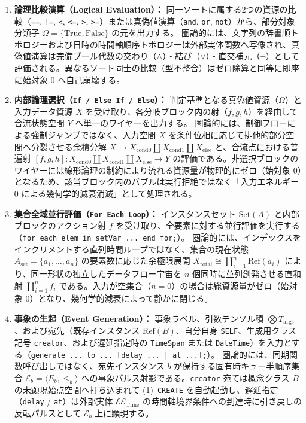 \documentclass[11pt,a4paper]{ltjsarticle}
\theoremstyle{definition}
\theoremstyle{plain}
\theoremstyle{remark}
\begin{document}
\begin{enumerate}[label=\textbf{(\arabic*)}, leftmargin=*]
    \item \textbf{論理比較演算（Logical Evaluation）：}
    同一ソートに属する2つの資源の比較（\texttt{==}, \texttt{!=}, \texttt{<}, \texttt{<=}, \texttt{>}, \texttt{>=}）または真偽値演算（\texttt{and}, \texttt{or}, \texttt{not}）から、部分対象分類子 $\Omega = \{\mathrm{True}, \mathrm{False}\}$ の元を出力する。
    圏論的には、文字列の辞書順トポロジーおよび日時の時間軸順序トポロジーは外部実体関数へ写像され、真偽値演算は完備ブール代数の交わり（$\wedge$）・結び（$\vee$）・直交補元（$\neg$）として評価される。異なるソート同士の比較（型不整合）はゼロ除算と同等に即座に始対象 $0$ へ自己崩壊する。

    \item \textbf{内部論理選択（\texttt{If / Else If / Else}）：}
    判定基準となる真偽値資源（$\Omega$）と入力データ資源 $X$ を受け取り、各分岐ブロック内の射（$f, g, h$）を経由して合流状態空間 $Y$ へ単一のワイヤーを出力する。
    圏論的には、制御フローによる強制ジャンプではなく、入力空間 $X$ を条件位相に応じて排他的部分空間へ分裂させる余積分解 $X \to X_{\mathrm{cond0}} \amalg X_{\mathrm{cond1}} \amalg X_{\mathrm{else}}$ と、合流点における普遍射 $[f, g, h] : X_{\mathrm{cond0}} \amalg X_{\mathrm{cond1}} \amalg X_{\mathrm{else}} \to Y$ の評価である。非選択ブロックのワイヤーには線形論理の制約により流れる資源量が物理的にゼロ（始対象 $0$）となるため、該当ブロック内のバブルは実行拒絶ではなく「入力エネルギー $0$ による幾何学的減衰消滅」として処理される。

    \item \textbf{集合全域並行評価（\texttt{For Each Loop}）：}
    インスタンスセット $\mathrm{Set}(A)$ と内部ブロックのアクション射 $f$ を受け取り、全要素に対する並行評価を実行する（\texttt{for each elem in setVar ... end for;}）。
    圏論的には、インデックスをインクリメントする直列時間ループではなく、集合の現在状態 $A_{\mathrm{set}} = \{a_1, \dots, a_n\}$ の要素数に応じた余極限展開 $X_{\mathrm{total}} \cong \coprod_{i=1}^n \mathrm{Ref}(a_i)$ により、同一形状の独立したデータフロー宇宙を $n$ 個同時に並列創発させる直和射 $\coprod_{i=1}^n f_i$ である。入力が空集合（$n=0$）の場合は総資源量がゼロ（始対象 $0$）となり、幾何学的減衰によって静かに閉じる。

    \item \textbf{事象の生起（Event Generation）：}
    事象ラベル、引数テンソル積 $\bigotimes T_{\mathrm{args}}$、および宛先（既存インスタンス $\mathrm{Ref}(B)$、自分自身 \texttt{SELF}、生成用クラス記号 \texttt{creator}、および遅延指定時の \texttt{TimeSpan} または \texttt{DateTime}）を入力とする（\texttt{generate ... to ... [delay ... | at ...];}）。
    圏論的には、同期関数呼び出しではなく、宛先インスタンス $b$ が保持する固有時キュー半順序集合 $\mathcal{E}_b = \langle E_b, \le_b \rangle$ \cite{milner1989} への事象パルス射影である。\texttt{creator} 宛ては概念クラス $B$ の未顕現始点空間へ打ち込まれて (1)~\texttt{CREATE} を自動起動し、遅延指定（\texttt{delay} / \texttt{at}）は外部実体 $\mathcal{EE}_{\mathrm{Time}}$ の時間軸境界条件への到達時に引き戻しの反転パルスとして $\mathcal{E}_b$ 上に顕現する。


\end{enumerate}
\end{document}
